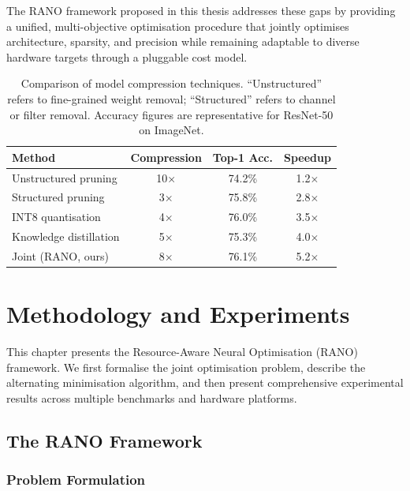 \documentclass[12pt,a4paper,oneside]{book}
\begin{document}
The RANO framework proposed in this thesis addresses these gaps by
providing a unified, multi-objective optimisation procedure that
jointly optimises architecture, sparsity, and precision while remaining
adaptable to diverse hardware targets through a pluggable cost model.

\begin{table}[htbp]
\centering
\caption{Comparison of model compression techniques. ``Unstructured''
refers to fine-grained weight removal; ``Structured'' refers to channel
or filter removal. Accuracy figures are representative for ResNet-50 on
ImageNet.}
\label{tab:compression}
\begin{tabular}{@{}lccc@{}}
\toprule
\textbf{Method} & \textbf{Compression} & \textbf{Top-1 Acc.} & \textbf{Speedup} \\
\midrule
Unstructured pruning    & 10$\times$ & 74.2\% & 1.2$\times$ \\
Structured pruning      & 3$\times$  & 75.8\% & 2.8$\times$ \\
INT8 quantisation       & 4$\times$  & 76.0\% & 3.5$\times$ \\
Knowledge distillation  & 5$\times$  & 75.3\% & 4.0$\times$ \\
Joint (RANO, ours)      & 8$\times$  & 76.1\% & 5.2$\times$ \\
\bottomrule
\end{tabular}
\end{table}

\newpage

\chapter{Methodology and Experiments}

This chapter presents the Resource-Aware Neural Optimisation (RANO)
framework. We first formalise the joint optimisation problem, describe
the alternating minimisation algorithm, and then present comprehensive
experimental results across multiple benchmarks and hardware platforms.

\section{The RANO Framework}

\subsection{Problem Formulation}
\end{document}

